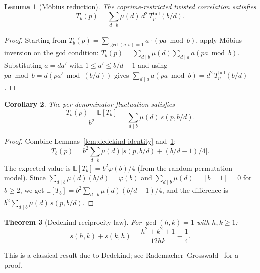 \documentclass[11pt]{article}
\newtheorem{theorem}{Theorem}[section]
\newtheorem{lemma}[theorem]{Lemma}
\newtheorem{corollary}[theorem]{Corollary}
\theoremstyle{definition}
\begin{document}
\begin{lemma}[M\"obius reduction]\label{lem:mobius-reduction}
The coprime-restricted twisted correlation satisfies
\begin{equation}\label{eq:mobius-red}
  T_b(p) = \sum_{d \mid b} \mu(d)\,d^2\, T_p^{\mathrm{full}}(b/d).
\end{equation}
\end{lemma}

\begin{proof}
Starting from $T_b(p) = \sum_{\gcd(a,b)=1} a \cdot (pa \bmod b)$,
apply M\"obius inversion on the gcd condition:
$T_b(p) = \sum_{d \mid b} \mu(d) \sum_{d \mid a} a(pa \bmod b)$.
Substituting $a = da'$ with $1 \le a' \le b/d - 1$ and using
$pa \bmod b = d(pa' \bmod (b/d))$ gives
$\sum_{d \mid a} a(pa \bmod b) = d^2\, T_p^{\mathrm{full}}(b/d)$.
\end{proof}

\begin{corollary}\label{cor:fluct-dedekind}
The per-denominator fluctuation satisfies
\begin{equation}\label{eq:fluct-dedekind}
  \frac{T_b(p) - \mathbb{E}[T_b]}{b^2}
  = \sum_{d \mid b} \mu(d)\, s(p, b/d).
\end{equation}
\end{corollary}

\begin{proof}
Combine Lemmas~\ref{lem:dedekind-identity} and~\ref{lem:mobius-reduction}:
\[
  T_b(p) = b^2 \sum_{d \mid b} \mu(d)\bigl[s(p,b/d) + (b/d - 1)/4\bigr].
\]
The expected value is
$\mathbb{E}[T_b] = b^2 \varphi(b)/4$
(from the random-permutation model).  Since
$\sum_{d \mid b} \mu(d)(b/d) = \varphi(b)$ and
$\sum_{d \mid b} \mu(d) = [b = 1] = 0$ for $b \ge 2$,
we get $\mathbb{E}[T_b] = b^2 \sum_{d \mid b} \mu(d)(b/d - 1)/4$,
and the difference is $b^2 \sum_{d \mid b} \mu(d)\,s(p,b/d)$.
\end{proof}

\begin{theorem}[Dedekind reciprocity law]\label{thm:reciprocity}
For $\gcd(h,k) = 1$ with $h, k \ge 1$:
\begin{equation}\label{eq:reciprocity}
  s(h,k) + s(k,h) = \frac{h^2 + k^2 + 1}{12hk} - \frac{1}{4}.
\end{equation}
\end{theorem}

This is a classical result due to Dedekind; see
Rademacher--Grosswald~\cite{RademacherGrosswald1972} for a proof.
\end{document}
